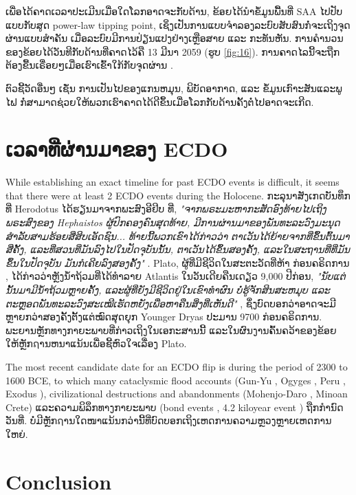 \documentclass[10pt,twocolumn,letterpaper]{article}
\begin{document}
ເພື່ອໄດ້ຄາດເວລາປະເມີນເມື່ອໃດໂລກອາດຈະກັບດ້ານ, ຂ້ອຍໄດ້ນຳຂໍ້ມູນພື້ນທີ່ SAA ໄປປັບແບບກັບສູດ power-law tipping point, ເຊິ່ງເປັນການແບບຈຳລອງລະບົບສັບສົນກໍ່ຈະເຖິງຈຸດຜ່ານແບບສຳຄັນ ເມື່ອລະບົບມີການປ່ຽນແປງຢ່າງເຫຼືອສາຍ ແລະ ກະທັນຫັນ. ການຄຳນວນຂອງຂ້ອຍໄດ້ວັນທີກັບດ້ານທີ່ຄາດໄວ້ຄື 13 ມີນາ 2059 (ຮູບ \ref{fig:16}). ການຄາດໄລນີ້ຈະຖືກຕ້ອງຂື້ນເຣື່ອຍໆເມື່ອເຮົາເຂົ້າໃກ້ກັບຈຸດຜ່ານ \cite{136}.

ຕົວຊີ້ວັດອື່ນໆ ເຊັ່ນ ການເປັນໄປຂອງແກນຫມຸນ, ພິບັດອາກາດ, ແລະ ຂໍ້ມູນເກົາະສັນແລະພູໄຟ ກໍ່ສາມາດຊ່ວຍໃຫ້ພວກເຮົາຄາດໄດ້ດີຂຶ້ນເມື່ອໂລກກັບດ້ານຄັ້ງຕໍ່ໄປອາດຈະເກີດ.

\section{ເວລາທີ່ຜ່ານມາຂອງ ECDO}
While establishing an exact timeline for past ECDO events is difficult, it seems that there were at least 2 ECDO events during the Holocene. ກະລຸນາສັງເກດບັນທຶກທີ່ Herodotus ໄດ້ຮຽນມາຈາກພະສົງອີຢິບ ທີ່, \textit{"ຈາກພຣະມະຫາກະສັດອົງທ້າຍໄປເຖິງພຣະສົງຂອງ Hephaistos ຜູ້ປົກຄອງຄົນສຸດທ້າຍ, ມີການຜ່ານມາຂອງພັນທະລະວົງມະນຸດສຳລັບສາມຮ້ອຍສີ່ສິບເອັດຊົນ... ທ້າຍນີ້ພວກເຂົາໄດ້ກ່າວວ່າ ຕາເວັນໄດ້ຍ້າຍຈາກທີ່ຂຶ້ນຕົ້ນມາສີ່ຄັ້ງ, ແລະທີ່ສວນທີ່ມັນລົງໄປໃນປັດຈຸບັນນັ້ນ, ຕາເວັນໄດ້ຂຶ້ນສອງຄັ້ງ, ແລະໃນສະຖານທີ່ທີ່ມັນຂຶ້ນໃນປັດຈຸບັນ ມັນກໍເຄີຍລົງສອງຄັ້ງ"} \cite{32}. Plato, ຜູ້ທີ່ມີຊີວິດໃນສະຕະວັດທີ່ຫ້າ ກ່ອນຄຣິດການ \cite{111}, ໄດ້ກ່າວວ່າຫຼັງນ້ຳຖ້ວມທີ່ໄດ້ທຳລາຍ Atlantis ໃນວັນເດີຍຄືນເດຽວ 9,000 ປີກ່ອນ, \textit{"ນັບແຕ່ນັ້ນມາມີນ້ຳຖ້ວມຫຼາຍຄັ້ງ, ແລະຜູ້ທີ່ຍັງມີຊີວິດຢູ່ໃນເຂົາທຳຜົນ ບໍ່ຮູ້ຈັກສິນສະຫມຸບ ແລະຕະຫຼອດພັນທະລະວົງສະເໝີເຮັດຫຍັງເພື່ອຫາຄືນສິ່ງທີ່ເຫັນດີ"} \cite{112}, ຊຶ່ງບົດບອກວ່າອາດຈະມີຫຼາຍກວ່າສອງຄັ້ງຕັ້ງແຕ່ໝົດສຸດຍຸກ Younger Dryas ປະມານ 9700 ກ່ອນຄຣິດການ. ພະຍານຫຼັກທາງກາຍະພາບທີ່ກ່າວເຖິງໃນເອກະສານນີ້ ແລະໃນຜົນງານຄົ້ນຄວ້າຂອງຂ້ອຍ \cite{2} ໃຫ້ຫຼັກຐານຫນາແນ້ນເພື່ອຊີ້ຫົວໃຈເລື່ອງ Plato.

The most recent candidate date for an ECDO flip is during the period of 2300 to 1600 BCE, to which many cataclysmic flood accounts (Gun-Yu \cite{113,114,115}, Ogyges \cite{116,117}, Peru \cite{118,119}, Exodus \cite{120}), civilizational destructions and abandonments (Mohenjo-Daro \cite{121}, Minoan Crete\cite{100,101}) ແລະຄວາມພິລຶກທາງກາຍະພາບ (bond events \cite{122}, 4.2 kiloyear event \cite{90}) ຖືກກໍານົດວັນທີ່. ບໍ່ມີຫຼັກຐານໃດໜາແນ້ນກວ່ານີ້ທີ່ບົດບອກເຖິງເຫດການຄວາມຫຼວງຫຼາຍເຫດການໃຫຍ່.

\section{Conclusion}
\end{document}
